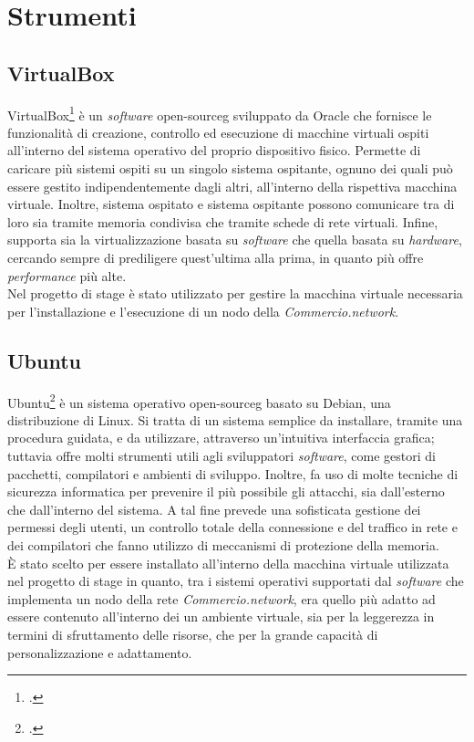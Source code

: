 \section{Strumenti}
\subsection{VirtualBox}

VirtualBox\footcite{site:virtual-box} è un \textit{software} \gls{open-sourceg} sviluppato da Oracle che fornisce le funzionalità di creazione, controllo ed esecuzione di macchine virtuali ospiti all'interno del sistema operativo del proprio dispositivo fisico. Permette di caricare più sistemi ospiti su un singolo sistema ospitante, ognuno dei quali può essere gestito indipendentemente dagli altri, all'interno della rispettiva macchina virtuale. Inoltre, sistema ospitato e sistema ospitante possono comunicare tra di loro sia tramite memoria condivisa che tramite schede di rete virtuali. Infine, supporta sia la virtualizzazione basata su \textit{software} che quella basata su \textit{hardware}, cercando sempre di prediligere quest'ultima alla prima, in quanto più offre \textit{performance} più alte.\\
Nel progetto di stage è stato utilizzato per gestire la macchina virtuale necessaria per l'installazione e l'esecuzione di un nodo della \textit{Commercio.network}.

\subsection{Ubuntu}

Ubuntu\footcite{site:ubuntu} è un sistema operativo \gls{open-sourceg} basato su Debian, una distribuzione di Linux. Si tratta di un sistema semplice da installare, tramite una procedura guidata, e da utilizzare, attraverso un'intuitiva interfaccia grafica; tuttavia offre molti strumenti utili agli sviluppatori \textit{software}, come gestori di pacchetti, compilatori e ambienti di sviluppo. Inoltre, fa uso di molte tecniche di sicurezza informatica per prevenire il più possibile gli attacchi, sia dall'esterno che dall'interno del sistema. A tal fine prevede una sofisticata gestione dei permessi degli utenti, un controllo totale della connessione e del traffico in rete e dei compilatori che fanno utilizzo di meccanismi di protezione della memoria. \\
È stato scelto per essere installato all'interno della macchina virtuale utilizzata nel progetto di stage in quanto, tra i sistemi operativi supportati dal \textit{software} che implementa un nodo della rete \textit{Commercio.network}, era quello più adatto ad essere contenuto all'interno dei un ambiente virtuale, sia per la leggerezza in termini di sfruttamento delle risorse, che per la grande capacità di personalizzazione e adattamento.

